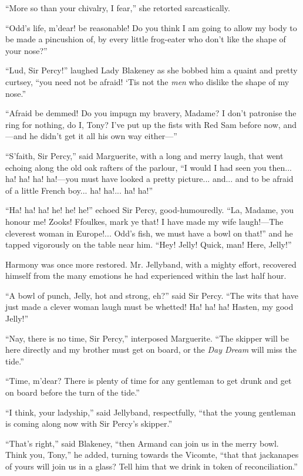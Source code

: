 \documentclass[paper=a5,BCOR=7mm,twoside,DIV=calc,12pt,usegeometry,chapterprefix,endperiod,headings=big]{scrbook}
\begin{document}
\enquote{More so than your chivalry, I fear,} she retorted sarcastically.

\enquote{Odd's life, m'dear! be reasonable! Do you think I am going to allow my body to be made a pincushion of, by every little frog-eater who don't like the shape of your nose?}

\enquote{Lud, Sir Percy!} laughed Lady Blakeney as she bobbed him a quaint and pretty curtsey, \enquote{you need not be afraid! `Tis not the \textit{men} who dislike the shape of my nose.}

\enquote{Afraid be demmed! Do you impugn my bravery, Madame? I don't patronise the ring for nothing, do I, Tony? I've put up the fists with Red Sam before now, and---and he didn't get it all his own way either---}

\enquote{S'faith, Sir Percy,} said Marguerite, with a long and merry laugh, that went echoing along the old oak rafters of the parlour, \enquote{I would I had seen you then... ha! ha! ha! ha!---you must have looked a pretty picture... and... and to be afraid of a little French boy... ha! ha!... ha! ha!}

\enquote{Ha! ha! ha! he! he! he!} echoed Sir Percy, good-humouredly. \enquote{La, Madame, you honour me! Zooks!  Ffoulkes, mark ye that! I have made my wife laugh!---The cleverest woman in Europe!... Odd's fish, we must have a bowl on that!} and he tapped vigorously on the table near him. \enquote{Hey! Jelly! Quick, man! Here, Jelly!}

Harmony was once more restored. Mr. Jellyband, with a mighty effort, recovered himself from the many emotions he had experienced within the last half hour.

\enquote{A bowl of punch, Jelly, hot and strong, eh?} said Sir Percy. \enquote{The wits that have just made a clever woman laugh must be whetted! Ha! ha! ha! Hasten, my good Jelly!}

\enquote{Nay, there is no time, Sir Percy,} interposed Marguerite. \enquote{The skipper will be here directly and my brother must get on board, or the \textit{Day Dream} will miss the tide.}

\enquote{Time, m'dear? There is plenty of time for any gentleman to get drunk and get on board before the turn of the tide.}

\enquote{I think, your ladyship,} said Jellyband, respectfully, \enquote{that the young gentleman is coming along now with Sir Percy's skipper.}

\enquote{That's right,} said Blakeney, \enquote{then Armand can join us in the merry bowl. Think you, Tony,} he added, turning towards the Vicomte, \enquote{that that jackanapes of yours will join us in a glass? Tell him that we drink in token of reconciliation.}
\end{document}
